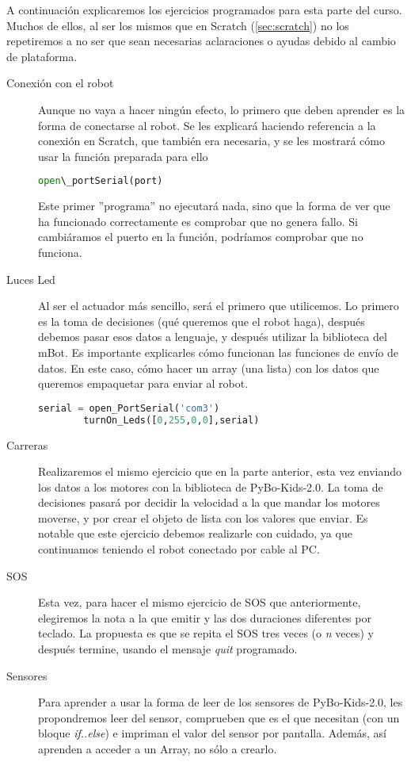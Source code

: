 A continuación explicaremos los ejercicios programados para esta parte del curso. Muchos de ellos, al ser los mismos que en Scratch (\ref{sec:scratch}) no los repetiremos a no ser que sean necesarias aclaraciones o ayudas debido al cambio de plataforma.

\begin{description}
	\item [Conexión con el robot] Aunque no vaya a hacer ningún efecto, lo primero que deben aprender es la forma de conectarse al robot. Se les explicará haciendo referencia a la conexión en Scratch, que también era necesaria, y se les mostrará cómo usar la función preparada para ello \begin{lstlisting}[language=Python]
		open\_portSerial(port)
	\end{lstlisting}
	Este primer ''programa'' no ejecutará nada, sino que la forma de ver que ha funcionado correctamente es comprobar que no genera fallo. Si cambiáramos el puerto en la función, podríamos comprobar que no funciona.
	\item [Luces Led] Al ser el actuador más sencillo, será el primero que utilicemos.  Lo primero es la toma de decisiones (qué queremos que el robot haga), después debemos pasar esos datos a lenguaje, y después utilizar la biblioteca del mBot. Es importante explicarles cómo funcionan las funciones de envío de datos. En este caso, cómo hacer un array (una lista) con los datos que queremos empaquetar para enviar al robot.
	\begin{lstlisting}[language=Python]
		serial = open_PortSerial('com3')
		turnOn_Leds([0,255,0,0],serial)
	\end{lstlisting}
	\item [Carreras] Realizaremos el mismo ejercicio que en la parte anterior, esta vez enviando los datos a los motores con la biblioteca de PyBo-Kids-2.0. La toma de decisiones pasará por decidir la velocidad a la que mandar los motores moverse, y por crear el objeto de lista con los valores que enviar. Es notable que este ejercicio debemos realizarle con cuidado, ya que continuamos teniendo el robot conectado por cable al PC.
	\item [SOS] Esta vez, para hacer el mismo ejercicio de SOS que anteriormente, elegiremos la nota a la que emitir y las dos duraciones diferentes por teclado. La propuesta es que se repita el SOS tres veces (o \textit{n} veces) y después termine, usando el mensaje \textit{quit} programado.
	\item [Sensores] Para aprender a usar la forma de leer de los sensores de PyBo-Kids-2.0, les propondremos leer del sensor, comprueben que es el que necesitan (con un bloque \textit{if..else}) e impriman el valor del sensor por pantalla. Además, así aprenden a acceder a un Array, no sólo a crearlo. \\

\end{description}

